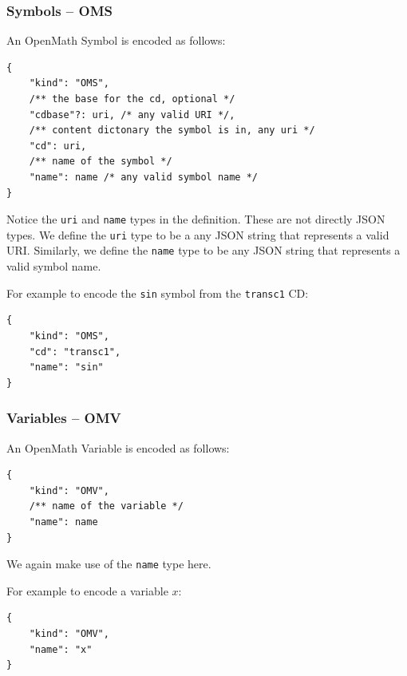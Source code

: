 \subsubsection{Symbols -- OMS}

An OpenMath Symbol is encoded as follows:
\\\begin{minipage}{\linewidth}\begin{lstlisting}
{
    "kind": "OMS",
    /** the base for the cd, optional */
    "cdbase"?: uri, /* any valid URI */, 
    /** content dictonary the symbol is in, any uri */
    "cd": uri,
    /** name of the symbol */
    "name": name /* any valid symbol name */
}
\end{lstlisting}\end{minipage}

Notice the \texttt{uri} and \texttt{name} types in the definition. 
These are not directly JSON types. 
We define the \texttt{uri} type to be a any JSON string that represents a valid URI. 
Similarly, we define the \texttt{name} type to be any JSON string that represents a valid symbol name. 

For example to encode the \texttt{sin} symbol from the \texttt{transc1} CD:
\\\begin{minipage}{\linewidth}\begin{lstlisting}
{
    "kind": "OMS",
    "cd": "transc1",
    "name": "sin"
}
\end{lstlisting}\end{minipage}

\subsubsection{Variables -- OMV}

An OpenMath Variable is encoded as follows:
\\\begin{minipage}{\linewidth}\begin{lstlisting}
{
    "kind": "OMV",
    /** name of the variable */
    "name": name
}
\end{lstlisting}\end{minipage}

We again make use of the \texttt{name} type here. 

For example to encode a variable $x$:
\\\begin{minipage}{\linewidth}\begin{lstlisting}
{
    "kind": "OMV",
    "name": "x"
}
\end{lstlisting}\end{minipage}

